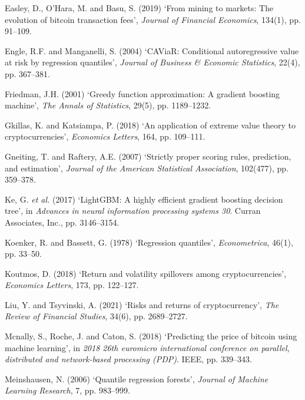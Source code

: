 \documentclass[
  a4paper,
  DIV=11,
  numbers=noendperiod]{scrreprt}
\newlength{\cslhangindent}
\newenvironment{CSLReferences}[2] %
 {\begin{list}{}{%
  \setlength{\itemindent}{0pt}
  \setlength{\leftmargin}{0pt}
  \setlength{\parsep}{0pt}
  \ifodd #1
   \setlength{\leftmargin}{\cslhangindent}
   \setlength{\itemindent}{-1\cslhangindent}
  \fi
  \setlength{\itemsep}{#2\baselineskip}}}
 {\end{list}}
\begin{document}
\begin{CSLReferences}{0}{1}
Easley, D., O'Hara, M. and Basu, S. (2019) {`From mining to markets: The
evolution of bitcoin transaction fees'}, \emph{Journal of Financial
Economics}, 134(1), pp. 91--109.

Engle, R.F. and Manganelli, S. (2004) {`{CAViaR}: Conditional
autoregressive value at risk by regression quantiles'}, \emph{Journal of
Business \& Economic Statistics}, 22(4), pp. 367--381.

Friedman, J.H. (2001) {`Greedy function approximation: A gradient
boosting machine'}, \emph{The Annals of Statistics}, 29(5), pp.
1189--1232.

Gkillas, K. and Katsiampa, P. (2018) {`An application of extreme value
theory to cryptocurrencies'}, \emph{Economics Letters}, 164, pp.
109--111.

Gneiting, T. and Raftery, A.E. (2007) {`Strictly proper scoring rules,
prediction, and estimation'}, \emph{Journal of the American Statistical
Association}, 102(477), pp. 359--378.

Ke, G. \emph{et al.} (2017) {`{LightGBM}: A highly efficient gradient
boosting decision tree'}, in \emph{Advances in neural information
processing systems 30}. Curran Associates, Inc., pp. 3146--3154.

Koenker, R. and Bassett, G. (1978) {`Regression quantiles'},
\emph{Econometrica}, 46(1), pp. 33--50.

Koutmos, D. (2018) {`Return and volatility spillovers among
cryptocurrencies'}, \emph{Economics Letters}, 173, pp. 122--127.

Liu, Y. and Tsyvinski, A. (2021) {`Risks and returns of
cryptocurrency'}, \emph{The Review of Financial Studies}, 34(6), pp.
2689--2727.

Mcnally, S., Roche, J. and Caton, S. (2018) {`Predicting the price of
bitcoin using machine learning'}, in \emph{2018 26th euromicro
international conference on parallel, distributed and network-based
processing (PDP)}. IEEE, pp. 339--343.

Meinshausen, N. (2006) {`Quantile regression forests'}, \emph{Journal of
Machine Learning Research}, 7, pp. 983--999.


\end{CSLReferences}
\end{document}

